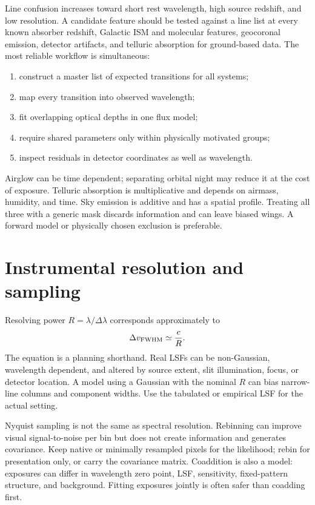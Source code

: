 Line confusion increases toward short rest wavelength, high source redshift,
and low resolution. A candidate feature should be tested against a line list
at every known absorber redshift, Galactic ISM and molecular features,
geocoronal emission, detector artifacts, and telluric absorption for
ground-based data. The most reliable workflow is simultaneous:
\begin{enumerate}
  \item construct a master list of expected transitions for all systems;
  \item map every transition into observed wavelength;
  \item fit overlapping optical depths in one flux model;
  \item require shared parameters only within physically motivated groups;
  \item inspect residuals in detector coordinates as well as wavelength.
\end{enumerate}

Airglow can be time dependent; separating orbital night may reduce it at the
cost of exposure. Telluric absorption is multiplicative and depends on
airmass, humidity, and time. Sky emission is additive and has a spatial
profile. Treating all three with a generic mask discards information and can
leave biased wings. A forward model or physically chosen exclusion is
preferable.

\section{Instrumental resolution and sampling}

Resolving power $R=\lambda/\Delta\lambda$ corresponds approximately to
\begin{equation}
 \Delta v_{\rm FWHM}\simeq \frac{c}{R}.
 \label{eq:r-to-v}
\end{equation}
The equation is a planning shorthand. Real LSFs can be non-Gaussian,
wavelength dependent, and altered by source extent, slit illumination, focus,
or detector location. A model using a Gaussian with the nominal $R$ can bias
narrow-line columns and component widths. Use the tabulated or empirical LSF
for the actual setting.

Nyquist sampling is not the same as spectral resolution. Rebinning can improve
visual signal-to-noise per bin but does not create information and generates
covariance. Keep native or minimally resampled pixels for the likelihood;
rebin for presentation only, or carry the covariance matrix. Coaddition is
also a model: exposures can differ in wavelength zero point, LSF, sensitivity,
fixed-pattern structure, and background. Fitting exposures jointly is often
safer than coadding first.

